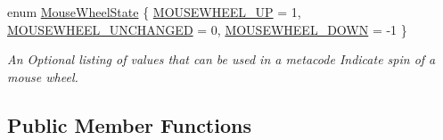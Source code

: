 \begin{DoxyCompactItemize}
enum \hyperlink{classMetaCode_a31155465656363d4ecdf9ce7ae5d7227}{MouseWheelState} \{ \hyperlink{classMetaCode_a31155465656363d4ecdf9ce7ae5d7227af0b2479902511454e2018979ee5e39e5}{MOUSEWHEEL\_\-UP} =  1, 
\hyperlink{classMetaCode_a31155465656363d4ecdf9ce7ae5d7227a70b73f42dccd13d9652d83c5f24cd966}{MOUSEWHEEL\_\-UNCHANGED} =  0, 
\hyperlink{classMetaCode_a31155465656363d4ecdf9ce7ae5d7227a912c43d8503790ded562c0c4a6a62ca7}{MOUSEWHEEL\_\-DOWN} =  -\/1
 \}
\begin{DoxyCompactList}\small\item\em An Optional listing of values that can be used in a metacode Indicate spin of a mouse wheel. \item\end{DoxyCompactList}\end{DoxyCompactItemize}
\subsection*{Public Member Functions}

